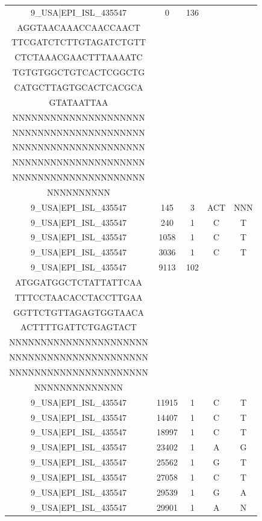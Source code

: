 \documentclass[a4paper,10pt]{article}
\begin{document}
\begin{longtable}{@{}ccccc@{}}
9\_USA|EPI\_ISL\_435547 & 0 & 136 & \begin{tabular}[c]{@{}c@{}}ATTAAAGGTTTATACCTTCCC\\ AGGTAACAAACCAACCAACT\\ TTCGATCTCTTGTAGATCTGTT\\ CTCTAAACGAACTTTAAAATC\\ TGTGTGGCTGTCACTCGGCTG\\ CATGCTTAGTGCACTCACGCA\\ GTATAATTAA\end{tabular} & \begin{tabular}[c]{@{}c@{}}NNNNNNNNNNNNNNNNNNNNN\\ NNNNNNNNNNNNNNNNNNNNN\\ NNNNNNNNNNNNNNNNNNNNN\\ NNNNNNNNNNNNNNNNNNNNN\\ NNNNNNNNNNNNNNNNNNNNN\\ NNNNNNNNNNNNNNNNNNNNN\\ NNNNNNNNNN\end{tabular} \\* \midrule
9\_USA|EPI\_ISL\_435547 & 145 & 3 & ACT & NNN \\* \midrule
9\_USA|EPI\_ISL\_435547 & 240 & 1 & C & T \\* \midrule
9\_USA|EPI\_ISL\_435547 & 1058 & 1 & C & T \\* \midrule
9\_USA|EPI\_ISL\_435547 & 3036 & 1 & C & T \\* \midrule
9\_USA|EPI\_ISL\_435547 & 9113 & 102 & \begin{tabular}[c]{@{}c@{}}CTGACACACGTTATGTGCTC\\ ATGGATGGCTCTATTATTCAA\\ TTTCCTAACACCTACCTTGAA\\ GGTTCTGTTAGAGTGGTAACA\\ ACTTTTGATTCTGAGTACT\end{tabular} & \begin{tabular}[c]{@{}c@{}}NNNNNNNNNNNNNNNNNNNNNN\\ NNNNNNNNNNNNNNNNNNNNNN\\ NNNNNNNNNNNNNNNNNNNNNN\\ NNNNNNNNNNNNNNNNNNNNNN\\ NNNNNNNNNNNNNN\end{tabular} \\* \midrule
9\_USA|EPI\_ISL\_435547 & 11915 & 1 & C & T \\* \midrule
9\_USA|EPI\_ISL\_435547 & 14407 & 1 & C & T \\* \midrule
9\_USA|EPI\_ISL\_435547 & 18997 & 1 & C & T \\* \midrule
9\_USA|EPI\_ISL\_435547 & 23402 & 1 & A & G \\* \midrule
9\_USA|EPI\_ISL\_435547 & 25562 & 1 & G & T \\* \midrule
9\_USA|EPI\_ISL\_435547 & 27058 & 1 & C & T \\* \midrule
9\_USA|EPI\_ISL\_435547 & 29539 & 1 & G & A \\* \midrule
9\_USA|EPI\_ISL\_435547 & 29901 & 1 & A & N \\* \bottomrule
\end{longtable}
\end{document}
